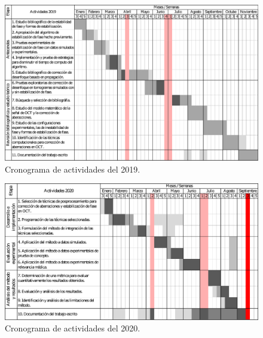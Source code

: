 \documentclass[letter, 12 pt]{article}
\begin{document}
\begin{figure}
    \centering
    \includegraphics[width=\textwidth]{Anteproyecto/Cronograma1.pdf}
    \caption{Cronograma de actividades del 2019.}
    \label{fig:2019}
\end{figure}
\begin{figure}
    \centering
    \includegraphics[width=\textwidth]{Anteproyecto/Cronograma2.pdf}
    \caption{Cronograma de actividades del 2020.}
    \label{fig:2020}
\end{figure}

\newpage
{}
%


\end{document}
